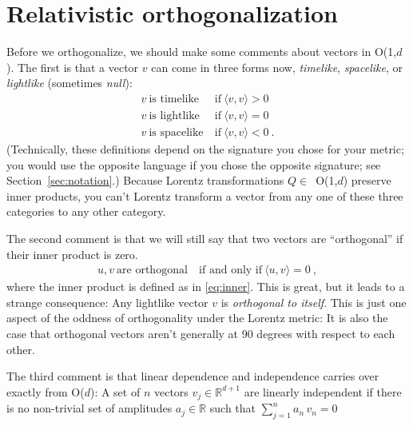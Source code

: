 \documentclass{article}
\newcommand{\inner}[2]{\langle{#1},{#2}\rangle}
\newcommand{\secref}[1]{Section~\ref{#1}}
\begin{document}
\section{Relativistic orthogonalization}\label{sec:orth}

Before we orthogonalize, we should make some comments about vectors in O(1,$d$).
The first is that a vector $v$ can come in three forms now, \emph{timelike}, \emph{spacelike}, or \emph{lightlike} (sometimes \emph{null}):
\begin{align}
    v ~ \mbox{is timelike} &~ \mbox{if} ~ \inner{v}{v} > 0 \\
    v ~ \mbox{is lightlike} &~ \mbox{if} ~ \inner{v}{v} = 0 \\
    v ~ \mbox{is spacelike} &~ \mbox{if} ~ \inner{v}{v} < 0 ~.
\end{align}
(Technically, these definitions depend on the signature you chose for your metric; you would use the opposite language if you chose the opposite signature; see \secref{sec:notation}.)
Because Lorentz transformations $Q\in$~O(1,$d$) preserve inner products, you can't Lorentz transform a vector from any one of these three categories to any other category.

The second comment is that we will still say that two vectors are ``orthogonal'' if their inner product is zero.
\begin{align}
    u,v ~\mbox{are orthogonal} ~ &\mbox{if and only if} ~ \inner{u}{v}=0 ~,
\end{align}
where the inner product is defined as in \eqref{eq:inner}.
This is great, but it leads to a strange consequence:
Any lightlike vector $v$ is \emph{orthogonal to itself}.
This is just one aspect of the oddness of orthogonality under the Lorentz metric:
It is also the case that orthogonal vectors aren't generally at 90 degrees with respect to each other.

The third comment is that linear dependence and independence carries over exactly from O($d$):
A set of $n$ vectors $v_j\in\mathbb{R}^{d+1}$ are linearly independent if there is no non-trivial set of amplitudes $a_j\in\mathbb{R}$ such that $\sum_{j=1}^n a_n\,v_n = 0$
\end{document}
